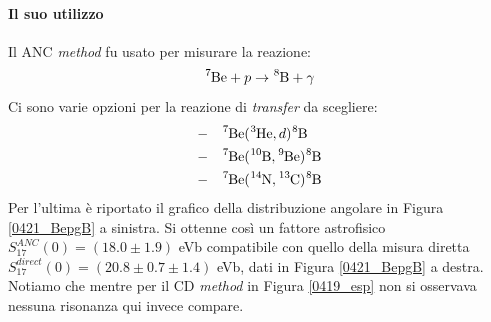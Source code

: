 \paragraph{Il suo utilizzo} Il ANC \textit{method} fu usato per misurare la reazione:
$$\ce{^7Be} + p \to \ce{^8B}+\gamma$$
Ci sono varie opzioni per la reazione di \textit{transfer} da scegliere:
\begin{align*}
	-&\quad \ce{^7Be}(\ce{^3He},d)\ce{^8B} \\
	-&\quad \ce{^7Be}(\ce{^{10}B},\ce{^9Be})\ce{^8B} \\
	-&\quad \ce{^7Be}(\ce{^{14}N},\ce{^{13}C})\ce{^8B} 
\end{align*}
Per l'ultima è riportato il grafico della distribuzione angolare in Figura \ref{0421_BepgB} a sinistra. Si ottenne così un fattore astrofisico $S_{17}^{ANC}(0) = (18.0\pm 1.9)$ eVb compatibile con quello della misura diretta $S_{17}^{direct}(0) = (20.8\pm 0.7\pm 1.4)$ eVb, dati in Figura \ref{0421_BepgB} a destra. Notiamo che mentre per il CD \textit{method} in Figura \ref{0419_esp} non si osservava nessuna risonanza qui invece compare.


